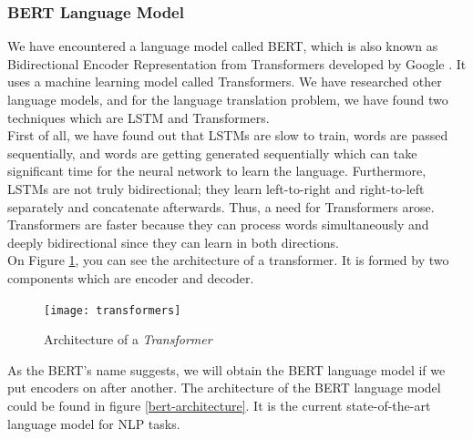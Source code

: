 \documentclass{mefsdp}
\begin{document}
	\subsubsection{BERT Language Model}
	We have encountered a language model called BERT, which is also known as Bidirectional Encoder Representation from Transformers developed by Google \cite{vaswani2017attention}. It uses a machine learning model called Transformers. We have researched other language models, and for the language translation problem, we have found two techniques which are LSTM and Transformers.\\
	
	First of all, we have found out that LSTMs are slow to train, words are passed sequentially, and words are getting generated sequentially which can take significant time for the neural network to learn the language. Furthermore, LSTMs are not truly bidirectional; they learn left-to-right and right-to-left separately and concatenate afterwards. Thus, a need for  Transformers arose. Transformers are faster because they can process words simultaneously and deeply bidirectional since they can learn in both directions. \\
	
	On Figure \ref{transformer}, you can see the architecture of a transformer. It is formed by two components which are encoder and decoder.\\
	\begin{figure}[ht!]
		\centering
		\texttt{[image: transformers]}
		\caption{Architecture of a \textit{Transformer}\label{transformer}}
	\end{figure}
	
	As the BERT's name suggests, we will obtain the BERT language model if we put encoders on after another. The architecture of the BERT language model could be found in figure \ref{bert-architecture}. It is the current state-of-the-art language model for NLP tasks. \cite{chan-fan-2019-recurrent}
	
\end{document}
